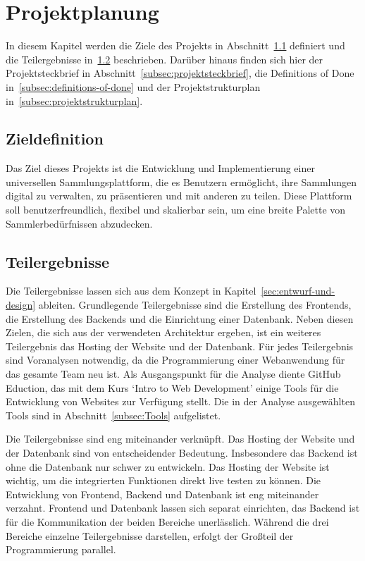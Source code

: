 \section{Projektplanung}\label{sec:projektplanung}

In diesem Kapitel werden die Ziele des Projekts in Abschnitt~\ref{subsec:zieldefinition} definiert und die Teilergebnisse in~\ref{subsec:teilergebnisses} beschrieben.
Darüber hinaus finden sich hier der Projektsteckbrief in Abschnitt~\ref{subsec:projektsteckbrief}, die Definitions of Done in~\ref{subsec:definitions-of-done} und der Projektstrukturplan in~\ref{subsec:projektstrukturplan}.

\subsection{Zieldefinition}\label{subsec:zieldefinition}
Das Ziel dieses Projekts ist die Entwicklung und Implementierung einer universellen Sammlungsplattform, die es Benutzern ermöglicht, ihre Sammlungen digital zu verwalten, zu präsentieren und mit anderen zu teilen.
Diese Plattform soll benutzerfreundlich, flexibel und skalierbar sein, um eine breite Palette von Sammlerbedürfnissen abzudecken.

\subsection{Teilergebnisse}\label{subsec:teilergebnisses}
Die Teilergebnisse lassen sich aus dem Konzept in Kapitel~\ref{sec:entwurf-und-design} ableiten.
Grundlegende Teilergebnisse sind die Erstellung des Frontends, die Erstellung des Backends und die Einrichtung einer Datenbank.
Neben diesen Zielen, die sich aus der verwendeten Architektur ergeben, ist ein weiteres Teilergebnis das Hosting der Website und der Datenbank.
Für jedes Teilergebnis sind Voranalysen notwendig, da die Programmierung einer Webanwendung für das gesamte Team neu ist.
Als Ausgangspunkt für die Analyse diente GitHub Eduction, das mit dem Kurs `Intro to Web Development' einige Tools für die Entwicklung von Websites zur Verfügung stellt.
Die in der Analyse ausgewählten Tools sind in Abschnitt~\ref{subsec:Tools} aufgelistet.

Die Teilergebnisse sind eng miteinander verknüpft.
Das Hosting der Website und der Datenbank sind von entscheidender Bedeutung.
Insbesondere das Backend ist ohne die Datenbank nur schwer zu entwickeln.
Das Hosting der Website ist wichtig, um die integrierten Funktionen direkt live testen zu können.
Die Entwicklung von Frontend, Backend und Datenbank ist eng miteinander verzahnt.
Frontend und Datenbank lassen sich separat einrichten, das Backend ist für die Kommunikation der beiden Bereiche unerlässlich.
Während die drei Bereiche einzelne Teilergebnisse darstellen, erfolgt der Großteil der Programmierung parallel.

